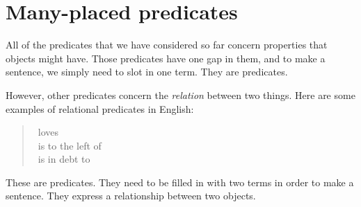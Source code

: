 %
%
%
%
%
%
%

\section{Many-placed predicates}
All of the predicates that we have considered so far concern properties that objects might have. Those predicates have one gap in them, and to make a sentence, we simply need to slot in one term. They are  predicates.



However, other predicates concern the \emph{relation} between two things. Here are some examples of relational predicates in English:
	\begin{quote}
		\blank\ loves \blank\\
		\blank\ is to the left of \blank\\
		\blank\ is in debt to \blank
	\end{quote}
These are  predicates. They need to be filled in with two terms in order to make a sentence. They express a relationship between two objects.




